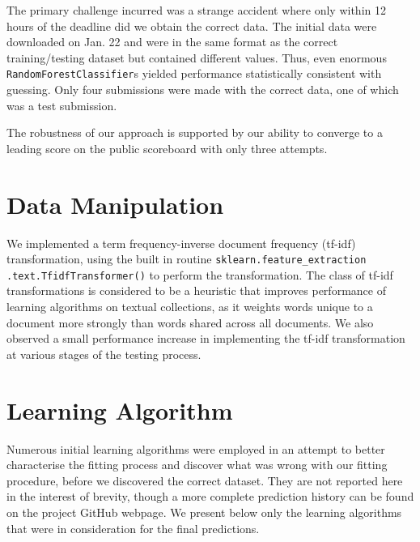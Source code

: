 \documentclass[10pt, preprint2]{aastex}
\begin{document}
The primary challenge incurred was a strange accident where only within 12 hours of the deadline did we obtain the correct data. The initial data were downloaded on Jan. 22 and were in the same format as the correct training/testing dataset but contained different values. Thus, even enormous \texttt{RandomForestClassifier}s yielded performance statistically consistent with guessing. Only four submissions were made with the correct data, one of which was a test submission.

The robustness of our approach is supported by our ability to converge to a leading score on the public scoreboard with only three attempts.

\section{Data Manipulation}

We implemented a term frequency-inverse document frequency (tf-idf) transformation, using the built in routine \texttt{sklearn.feature\_extraction} \texttt{.text.TfidfTransformer()} to perform the transformation. The class of tf-idf transformations is considered to be a heuristic that improves performance of learning algorithms on textual collections, as it weights words unique to a document more strongly than words shared across all documents. We also observed a small performance increase in implementing the tf-idf transformation at various stages of the testing process.

\section{Learning Algorithm}

Numerous initial learning algorithms were employed in an attempt to better characterise the fitting process and discover what was wrong with our fitting procedure, before we discovered the correct dataset. They are not reported here in the interest of brevity, though a more complete prediction history can be found on the project GitHub webpage. We present below only the learning algorithms that were in consideration for the final predictions.
\end{document}
